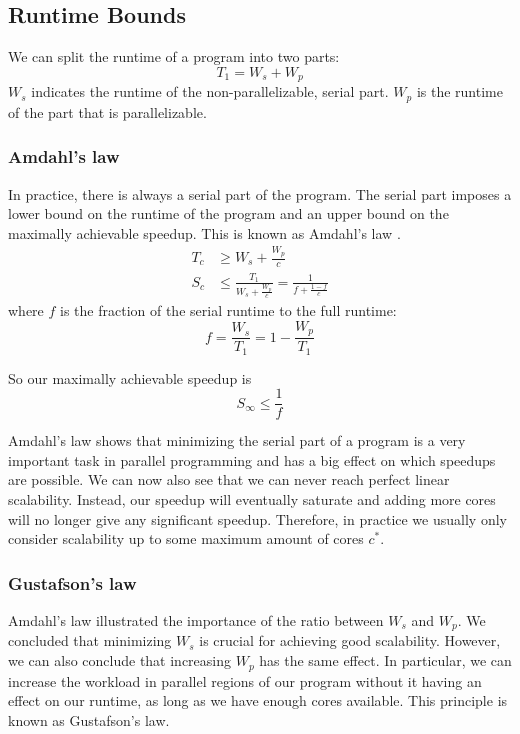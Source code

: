 \subsection{Runtime Bounds}

We can split the runtime of a program into two parts:
\begin{equation}
    T_1 = W_s + W_p
\end{equation}
$W_s$ indicates the runtime of the non-parallelizable, serial part.
$W_p$ is the runtime of the part that is parallelizable.

\subsubsection{Amdahl's law}

In practice, there is always a serial part of the program.
The serial part imposes a lower bound on the runtime of the program and an upper bound on the maximally achievable speedup.
This is known as Amdahl's law \cite{amdahl1967}.
\begin{align*}
    T_c &\geq W_s + \frac{W_p}{c} \\
    S_c &\leq \frac{T_1}{W_s + \frac{W_p}{c}} = \frac{1}{f + \frac{1-f}{c}}
\end{align*}
where $f$ is the fraction of the serial runtime to the full runtime:
\begin{equation*}
    f = \frac{W_s}{T_1} = 1 - \frac{W_p}{T_1}
\end{equation*}

So our maximally achievable speedup is
\begin{equation}
    S_\infty \leq \frac{1}{f}
\end{equation}

Amdahl's law shows that minimizing the serial part of a program is a very important task in parallel programming and has a big effect on which speedups are possible.
We can now also see that we can never reach perfect linear scalability.
Instead, our speedup will eventually saturate and adding more cores will no longer give any significant speedup.
Therefore, in practice we usually only consider scalability up to some maximum amount of cores $c^*$.

\subsubsection{Gustafson's law}

Amdahl's law illustrated the importance of the ratio between $W_s$ and $W_p$.
We concluded that minimizing $W_s$ is crucial for achieving good scalability.
However, we can also conclude that increasing $W_p$ has the same effect.
In particular, we can increase the workload in parallel regions of our program without it having an effect on our runtime, as long as we have enough cores available.
This principle is known as Gustafson's law.
